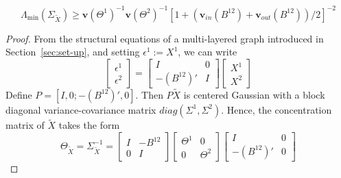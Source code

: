 \begin{proposition}\label{prop:RE-bound}
\begin{equation*}
\Lambda_{\min}(\Sigma_{\widetilde{X}}) \ge \mathbf{v}(\Theta^1)^{-1} \mathbf{v}(\Theta^2)^{-1} 
\left[1+\left(\mathbf{v}_{in}(B^{12})+\mathbf{v}_{out}(B^{12})\right)/2 \right]^{-2}
\end{equation*}
\end{proposition}
\begin{proof}
From the structural equations of a multi-layered graph introduced in Section~\ref{sec:set-up}, and setting $\epsilon^1:= X^1$, we can write 
\begin{equation}\label{eqn:invert-SEM}
\left[\begin{array}{c}\epsilon^1 \\ \epsilon^2 \end{array} \right] = 
\left[\begin{array}{cc}I & 0 \\ -(B^{12})' & I \end{array}\right] 
\left[\begin{array}{c} X^1 \\ X^2 \end{array} \right]
\end{equation}
Define $P = [I, 0; -(B^{12})', 0]$. Then  $P \widetilde{X}$ is centered Gaussian with a block diagonal variance-covariance matrix  $diag(\Sigma^1, \Sigma^2)$. Hence, the concentration matrix of $\widetilde{X}$ takes the form
\begin{equation*}
\Theta_{\tilde{X}} = \Sigma^{-1}_{\tilde{X}} = \left[ \begin{array}{cc}I & -B^{12} \\ 0 & I\end{array} \right] \left[ \begin{array}{cc} \Theta^1 & 0 \\ 0 & \Theta^2 \end{array} \right] \left[\begin{array}{cc}I & 0 \\ -(B^{12})' & 0  \end{array} \right]

\end{equation*}
\end{proof}
